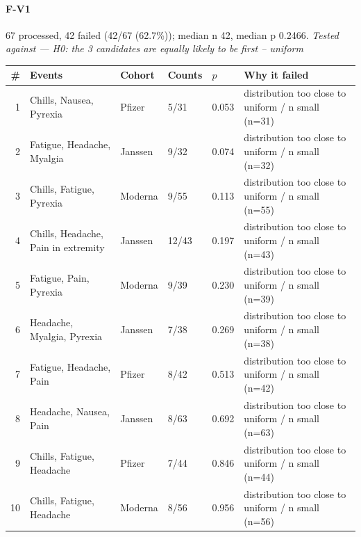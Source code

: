 \documentclass[11pt]{article}
\begin{document}
\paragraph{F-V1} 67 processed, 42 failed (42/67 (62.7\%)); median n 42, median p 0.2466. \emph{Tested against --- H0: the 3 candidates are equally likely to be first -- uniform} \\
\begin{longtable}{@{}r p{3.9cm} p{2.5cm} l l p{4.4cm}@{}}
\toprule
\# & Events & Cohort & Counts & $p$ & Why it failed \\
\midrule \endhead
1 & Chills, Nausea, Pyrexia & Pfizer & 5/31 & 0.053 & distribution too close to uniform / n small (n=31) \\
2 & Fatigue, Headache, Myalgia & Janssen & 9/32 & 0.074 & distribution too close to uniform / n small (n=32) \\
3 & Chills, Fatigue, Pyrexia & Moderna & 9/55 & 0.113 & distribution too close to uniform / n small (n=55) \\
4 & Chills, Headache, Pain in extremity & Janssen & 12/43 & 0.197 & distribution too close to uniform / n small (n=43) \\
5 & Fatigue, Pain, Pyrexia & Moderna & 9/39 & 0.230 & distribution too close to uniform / n small (n=39) \\
6 & Headache, Myalgia, Pyrexia & Janssen & 7/38 & 0.269 & distribution too close to uniform / n small (n=38) \\
7 & Fatigue, Headache, Pain & Pfizer & 8/42 & 0.513 & distribution too close to uniform / n small (n=42) \\
8 & Headache, Nausea, Pain & Janssen & 8/63 & 0.692 & distribution too close to uniform / n small (n=63) \\
9 & Chills, Fatigue, Headache & Pfizer & 7/44 & 0.846 & distribution too close to uniform / n small (n=44) \\
10 & Chills, Fatigue, Headache & Moderna & 8/56 & 0.956 & distribution too close to uniform / n small (n=56) \\
\bottomrule
\end{longtable}
\end{document}
